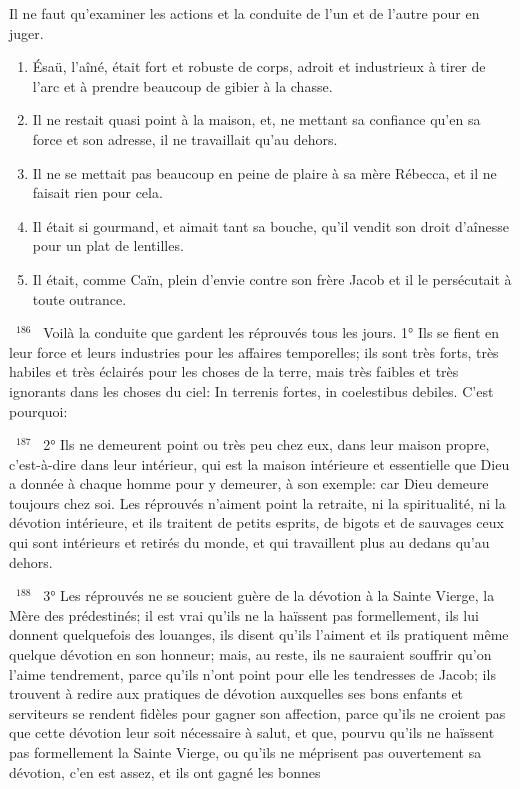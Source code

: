 \documentclass[paper=a5,pagesize=pdftex,fontsize=15pt,headinclude=on,twoside=off]{scrbook}
\newcommand{\negphantom}[1]{\settowidth{\dimen0}{#1}\hspace*{-\dimen0}}
\newcommand{\versenb}[1]{\par \vspace{10pt}~\negphantom{~${}^{#1}$~}${}^{#1}$~}
\begin{document}
Il ne faut qu'examiner les actions et la conduite de l'un et de l'autre pour en juger.
\begin{enumerate}[label=\arabic*°]
  \item Ésaü, l'aîné, était fort et robuste de corps, adroit et industrieux à tirer de l'arc et à prendre beaucoup de gibier à la chasse.
  \item Il ne restait quasi point à la maison, et, ne mettant sa confiance qu'en sa force et son adresse, il ne travaillait qu'au dehors.
  \item Il ne se mettait pas beaucoup en peine de plaire à sa mère Rébecca, et il ne faisait rien pour cela.
  \item Il était si gourmand, et aimait tant sa bouche, qu'il vendit son droit d'aînesse pour un plat de lentilles.
  \item Il était, comme Caïn, plein d'envie contre son frère Jacob et il le persécutait à toute outrance.
\end{enumerate}
\versenb{186} Voilà la conduite que gardent les réprouvés tous les jours.
1° Ils se fient en leur force et leurs industries pour les affaires temporelles; ils sont très forts, très habiles et très
éclairés pour les choses de la terre, mais très faibles et très ignorants dans les choses du ciel: In terrenis fortes, in
coelestibus debiles. C'est pourquoi:
\versenb{187} 2° Ils ne demeurent point ou très peu chez eux, dans leur maison propre, c'est-à-dire dans leur intérieur, qui
est la maison intérieure et essentielle que Dieu a donnée à chaque homme pour y demeurer, à son exemple: car
Dieu demeure toujours chez soi. Les réprouvés n'aiment point la retraite, ni la spiritualité, ni la dévotion intérieure,
et ils traitent de petits esprits, de bigots et de sauvages ceux qui sont intérieurs et retirés du monde, et qui
travaillent plus au dedans qu'au dehors.
\versenb{188} 3° Les réprouvés ne se soucient guère de la dévotion à la Sainte Vierge, la Mère des prédestinés; il est vrai
qu'ils ne la haïssent pas formellement, ils lui donnent quelquefois des louanges, ils disent qu'ils l'aiment et ils
pratiquent même quelque dévotion en son honneur; mais, au reste, ils ne sauraient souffrir qu'on l'aime
tendrement, parce qu'ils n'ont point pour elle les tendresses de Jacob; ils trouvent à redire aux pratiques de
dévotion auxquelles ses bons enfants et serviteurs se rendent fidèles pour gagner son affection, parce qu'ils ne
croient pas que cette dévotion leur soit nécessaire à salut, et que, pourvu qu'ils ne haïssent pas formellement la
Sainte Vierge, ou qu'ils ne méprisent pas ouvertement sa dévotion, c'en est assez, et ils ont gagné les bonnes
\end{document}
